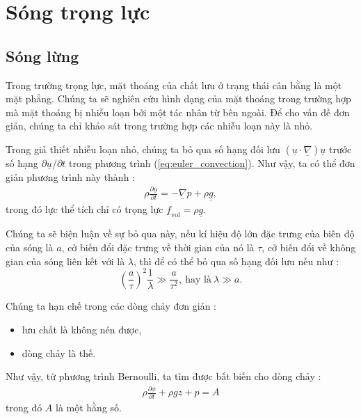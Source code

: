 \documentclass[CO_LUU_CHAT.tex]{subfiles}
\begin{document}
\section{Sóng trọng lực}

\subsection{Sóng lừng}

Trong trường trọng lực, mặt thoáng của chất lưu ở trạng thái cân bằng là một mặt phẳng. Chúng ta sẽ nghiên cứu hình dạng của mặt thoáng trong trường hợp mà mặt thoáng bị nhiễu loạn bởi một tác nhân từ bên ngoài. Để cho vấn đề đơn giản, chúng ta chỉ khảo sát trong trường hợp các nhiễu loạn này là nhỏ.

Trong giả thiết nhiễu loạn nhỏ, chúng ta bỏ qua số hạng đối lưu $\left(\underline{u}\cdot\underline{\nabla}\right)\underline{u}$ trước số hạng $\partial\underline{u}/\partial t$ trong phương trình (\ref{eq:euler_convection}). Như vậy, ta có thể đơn giản phương trình này thành :
\begin{equation}\label{eq:euler_convection_wave}
	\begin{aligned}
		\rho\frac{\partial\underline{u}}{\partial t}=-\underline{\nabla}p+\rho\underline{g},
	\end{aligned}
\end{equation}
trong đó lực thể tích chỉ có trọng lực $\underline{f}_{\text{vol}}=\rho\underline{g}$.

Chúng ta sẽ biện luận về sự bỏ qua này, nếu kí hiệu độ lớn đặc trưng của biên độ của sóng là $a$, cở biến đổi đặc trưng về thời gian của nó là $\tau$, cở biến đổi về không gian của sóng liên kết với là $\lambda$, thì để có thể bỏ qua số hạng đối lưu nếu như :
$$
\left(\frac{a}{\tau}\right)^2\frac{1}{\lambda}\gg\frac{a}{\tau^2},\ \text{hay là}\ \lambda\gg a.
$$

Chúng ta hạn chế trong các dòng chảy đơn giản :
\begin{itemize}
	\item lưu chất là không nén được,
	\item dòng chảy là thế.
\end{itemize}

Như vậy, từ phương trình Bernoulli, ta tìm được bất biến cho dòng chảy :
\begin{equation}\label{eq:invariant_wave_grav}
	\begin{aligned}
		\rho\frac{\partial\phi}{\partial t}+\rho gz+p=A
	\end{aligned}
\end{equation}
trong đó $A$ là một hằng số.
\end{document}
